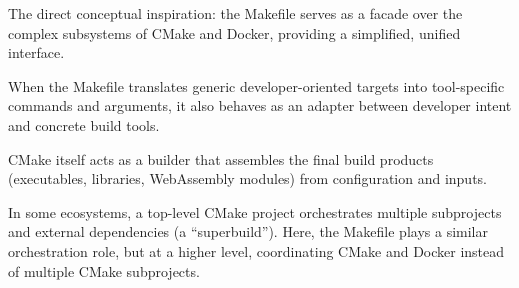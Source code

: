 \documentclass[11pt]{article}
\begin{document}
\begin{description}[style=nextline]
  \item[Facade Pattern (GoF)]
    The direct conceptual inspiration: the Makefile serves as a facade over the complex subsystems of CMake and Docker, providing a simplified, unified interface.

  \item[Adapter Pattern]
    When the Makefile translates generic developer-oriented targets into tool-specific commands and arguments, it also behaves as an adapter between developer intent and concrete build tools.

  \item[Builder Pattern]
    CMake itself acts as a builder that assembles the final build products (executables, libraries, WebAssembly modules) from configuration and inputs.

  \item[Superbuild Pattern]
    In some ecosystems, a top-level CMake project orchestrates multiple subprojects and external dependencies (a ``superbuild''). Here, the Makefile plays a similar orchestration role, but at a higher level, coordinating CMake and Docker instead of multiple CMake subprojects.
\end{description}
\end{document}
